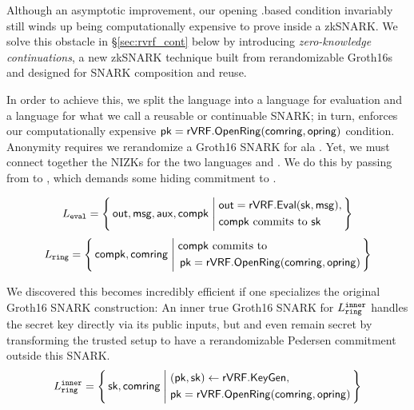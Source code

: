Although an asymptotic improvement, our opening \rVRF.\OpenRing based condition invariably
still winds up being computationally expensive to prove inside a zkSNARK.
We solve this obstacle in \S\ref{sec:rvrf_cont} below by introducing
{\em zero-knowledge continuations}, a new zkSNARK technique built from
rerandomizable Groth16s \cite{Groth16} and designed for SNARK composition and reuse.

In order to achieve this, we split the language \Lrvrf into
a language \Leval for \rVRF evaluation and a language
\Lring for what we call a reusable or continuable SNARK; in turn, \Lring enforces our computationally 
expensive $\mathsf{pk} = {\mathsf{rVRF}}.{\mathsf{OpenRing}}(\mathsf{comring},\mathsf{opring})$ condition.  Anonymity requires we rerandomize a Groth16 SNARK for \Lring
ala \cite[Theorem 3, Appendix C, pp. 31]{RandomizationGroth16}.
%
Yet, we must connect together the NIZKs for the two languages  \Leval and \Lring. We do this by passing \pk from \Lring to \Leval, which
demands some hiding commitment \compk to \pk.

%
\def\tmpAA{\Out = \rVRF.\Eval(\sk,\msg)}%
\def\tmpBB{\textrm{\compk commits to\ \sk}}%
$$ \Leval = \Setst{ \Out, \msg, \aux, \compk }{
	\eprint{
	\tmpAA, \, \tmpBB
    }{
	\begin{aligned}
	&\tmpAA, \\
	&\tmpBB \\
	\end{aligned}
    }
} $$
\def\tmpAA{\textrm{\compk commits to\ }}%
\def\tmpBB{\rVRF.\OpenRing(\comring,\openring)}%
$$ \Lring = \Setst{ \compk, \comring }{
	\eprint{
	\tmpAA \pk = \tmpBB
	}{
    \begin{aligned}
	&\tmpAA \\
	&\, \pk = \tmpBB \\
    \end{aligned}
	}
} $$

We discovered this becomes incredibly efficient if one specializes
the original Groth16 SNARK construction:  An inner true Groth16 SNARK for $L_{\mathtt{ring}}^{\mathtt{inner}}$
handles the secret key \sk directly via its public inputs, but
\sk and even \pk remain secret by transforming the trusted setup to have
a rerandomizable Pedersen commitment \compk outside this SNARK.
$$ \Lring^\inner = \Setst{ \sk, \comring}{
    \eprint{
    (\pk,\sk) \leftarrow \rVRF.\KeyGen, \, %
    \pk = \rVRF.\OpenRing(\comring,\openring) 
    }{
    \begin{aligned}
        &(\pk,\sk) \leftarrow \rVRF.\KeyGen, \\
        &\pk = \rVRF.\OpenRing(\comring,\openring)  \\      
    \end{aligned}
    }
} $$

